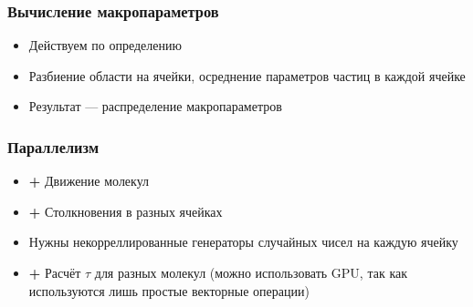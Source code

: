 \documentclass[onlymath]{beamer}
\newcommand\good{{\color{green!50!black} \textbf{+}}}
\begin{document}
\begin{frame}
  \frametitle{Вычисление макропараметров}
  \begin{itemize}
  \item Действуем по определению
  \item Разбиение области на ячейки, осреднение параметров частиц в
    каждой ячейке
  \item Результат — распределение макропараметров
  \end{itemize}
\end{frame}

\begin{frame}
  \frametitle{Параллелизм}
  \begin{itemize}
  \item \good{} Движение молекул
  \item \good{} Столкновения в разных ячейках
  \item Нужны некорреллированные генераторы случайных чисел на каждую ячейку
  \item \good{} Расчёт $\tau$ для разных молекул (можно использовать
    GPU, так как используются лишь простые векторные операции)
  \end{itemize}
\end{frame}
\end{document}
